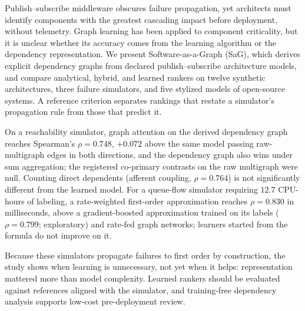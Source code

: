 Publish--subscribe middleware obscures failure propagation, yet architects must identify components with the greatest cascading impact before deployment, without telemetry. Graph learning has been applied to component criticality, but it is unclear whether its accuracy comes from the learning algorithm or the dependency representation. We present Software-as-a-Graph (SaG), which derives explicit dependency graphs from declared publish--subscribe architecture models, and compare analytical, hybrid, and learned rankers on twelve synthetic architectures, three failure simulators, and five stylized models of open-source systems. A reference criterion separates rankings that restate a simulator's propagation rule from those that predict it.

On a reachability simulator, graph attention on the derived dependency graph reaches Spearman's $\rho = 0.748$, $+0.072$ above the same model passing raw-multigraph edges in both directions, and the dependency graph also wins under sum aggregation; the registered co-primary contrasts on the raw multigraph were null. Counting direct dependents (afferent coupling, $\rho = 0.764$) is not significantly different from the learned model. For a queue-flow simulator requiring $12.7$ CPU-hours of labeling, a rate-weighted first-order approximation reaches $\rho = 0.830$ in milliseconds, above a gradient-boosted approximation trained on its labels ($\rho = 0.799$; exploratory) and rate-fed graph networks; learners started from the formula do not improve on it.

Because these simulators propagate failures to first order by construction, the study shows when learning is unnecessary, not yet when it helps: representation mattered more than model complexity. Learned rankers should be evaluated against references aligned with the simulator, and training-free dependency analysis supports low-cost pre-deployment review.
